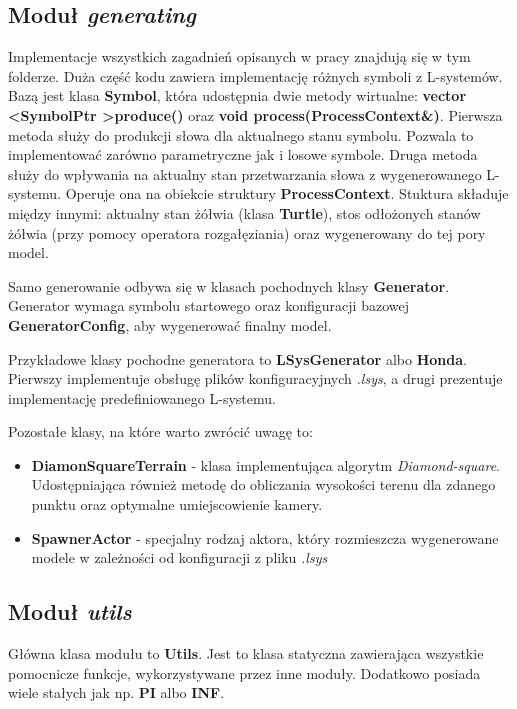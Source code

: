 \documentclass[inz,longabstract]{iithesis}
\begin{document}
        \subsection{Moduł \textit{generating}}
            Implementacje wszystkich zagadnień opisanych w pracy znajdują się w tym folderze. Duża część kodu zawiera implementację różnych symboli z L-systemów. Bazą jest klasa \textbf{Symbol}, która udostępnia dwie metody wirtualne: \textbf{vector \textless SymbolPtr \textgreater produce()} oraz \textbf{void process(ProcessContext\&)}. Pierwsza metoda służy do produkcji słowa dla aktualnego stanu symbolu. Pozwala to implementować zarówno parametryczne jak i losowe symbole. Druga metoda służy do wpływania na aktualny stan przetwarzania słowa z wygenerowanego L-systemu. Operuje ona na obiekcie struktury \textbf{ProcessContext}. Stuktura składuje między innymi: aktualny stan żółwia (klasa \textbf{Turtle}), stos odłożonych stanów żółwia (przy pomocy operatora rozgałęziania) oraz wygenerowany do tej pory model.
            
            Samo generowanie odbywa się w klasach pochodnych klasy \textbf{Generator}. Generator wymaga symbolu startowego oraz konfiguracji bazowej \textbf{GeneratorConfig}, aby wygenerować finalny model.
            
            Przykładowe klasy pochodne generatora to \textbf{LSysGenerator} albo \textbf{Honda}. Pierwszy implementuje obsługę plików konfiguracyjnych \textit{.lsys}, a drugi prezentuje implementację predefiniowanego L-systemu.
            
            Pozostałe klasy, na które warto zwrócić uwagę to:
            \begin{itemize}
                \item \textbf{DiamonSquareTerrain} - klasa implementująca algorytm \textit{Diamond-square}. Udostępniająca również metodę do obliczania wysokości terenu dla zdanego punktu oraz optymalne umiejscowienie kamery.
                \item \textbf{SpawnerActor} - specjalny rodzaj aktora, który rozmieszcza wygenerowane modele w zależności od konfiguracji z pliku \textit{.lsys} 
            \end{itemize}
            
        \subsection{Moduł \textit{utils}}
            Główna klasa modułu to \textbf{Utils}. Jest to klasa statyczna zawierająca wszystkie pomocnicze funkcje, wykorzystywane przez inne moduły. Dodatkowo posiada wiele stałych jak np. \textbf{PI} albo \textbf{INF}.
            
\end{document}

